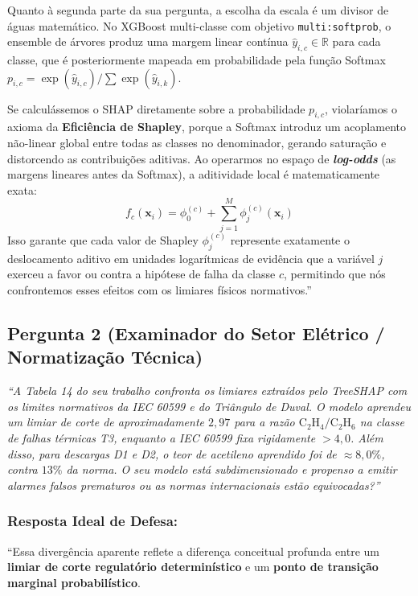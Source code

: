 \documentclass[11pt,a4paper]{article}
\begin{document}
Quanto à segunda parte da sua pergunta, a escolha da escala é um divisor de águas matemático. No XGBoost multi-classe com objetivo \texttt{multi:softprob}, o ensemble de árvores produz uma margem linear contínua $\hat{y}_{i, c} \in \mathbb{R}$ para cada classe, que é posteriormente mapeada em probabilidade pela função Softmax $p_{i, c} = \exp(\hat{y}_{i, c}) / \sum \exp(\hat{y}_{i, k})$. 

Se calculássemos o SHAP diretamente sobre a probabilidade $p_{i, c}$, violaríamos o axioma da \textbf{Eficiência de Shapley}, porque a Softmax introduz um acoplamento não-linear global entre todas as classes no denominador, gerando saturação e distorcendo as contribuições aditivas. Ao operarmos no espaço de \textbf{\textit{log-odds}} (as margens lineares antes da Softmax), a aditividade local é matematicamente exata:
$$f_c(\mathbf{x}_i) = \phi_0^{(c)} + \sum_{j=1}^M \phi_j^{(c)}(\mathbf{x}_i)$$
Isso garante que cada valor de Shapley $\phi_j^{(c)}$ represente exatamente o deslocamento aditivo em unidades logarítmicas de evidência que a variável $j$ exerceu a favor ou contra a hipótese de falha da classe $c$, permitindo que nós confrontemos esses efeitos com os limiares físicos normativos.''\vspace{0.3cm}

\subsection{Pergunta 2 (Examinador do Setor Elétrico / Normatização Técnica)}
\textit{``A Tabela 14 do seu trabalho confronta os limiares extraídos pelo TreeSHAP com os limites normativos da IEC 60599 e do Triângulo de Duval. O modelo aprendeu um limiar de corte de aproximadamente $2{,}97$ para a razão $\text{C}_2\text{H}_4/\text{C}_2\text{H}_6$ na classe de falhas térmicas T3, enquanto a IEC 60599 fixa rigidamente $> 4{,}0$. Além disso, para descargas D1 e D2, o teor de acetileno aprendido foi de $\approx 8{,}0\%$, contra $13\%$ da norma. O seu modelo está subdimensionado e propenso a emitir alarmes falsos prematuros ou as normas internacionais estão equivocadas?''}

\subsubsection{Resposta Ideal de Defesa:}
``Essa divergência aparente reflete a diferença conceitual profunda entre um \textbf{limiar de corte regulatório determinístico} e um \textbf{ponto de transição marginal probabilístico}.
\end{document}
